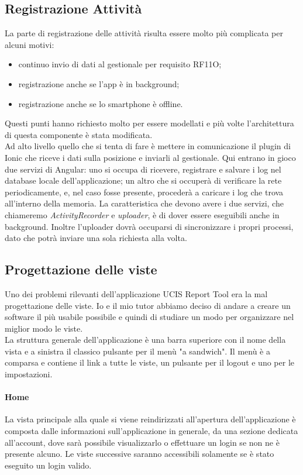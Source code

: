 \subsection{Registrazione Attività}
La parte di registrazione delle attività risulta essere molto più complicata per alcuni motivi:
\begin{itemize}
  \item continuo invio di dati al gestionale per requisito RF11O;
  \item registrazione anche se l'app è in background;
  \item registrazione anche se lo smartphone è offline.
\end{itemize}
Questi punti hanno richiesto molto per essere modellati e più volte l'architettura di questa componente è stata modificata. \\
\noindent Ad alto livello quello che si tenta di fare è mettere in comunicazione il plugin di Ionic che riceve i dati sulla posizione e inviarli al
gestionale. Qui entrano in gioco due servizi di Angular: uno si occupa di ricevere, registrare e salvare i log nel database locale
dell'applicazione; un altro che si occuperà di verificare la rete periodicamente, e, nel caso fosse presente, procederà a caricare i log che
trova all'interno della memoria. La caratteristica che devono avere i due servizi, che chiameremo \textit{ActivityRecorder} e \textit{uploader}, è di dover
essere eseguibili anche in background. Inoltre l'uploader dovrà occuparsi di sincronizzare i propri processi, dato che potrà inviare una
sola richiesta alla volta. 

\subsection{Progettazione delle viste}
Uno dei problemi rilevanti dell'applicazione UCIS Report Tool era la mal progettazione delle viste. Io e il mio tutor
abbiamo deciso di andare a creare un software il più usabile possibile e quindi di studiare un modo per organizzare nel
miglior modo le viste. \\ 
\noindent La struttura generale dell'applicazione è una barra superiore con il nome della vista e a sinistra il classico
pulsante per il menù "a sandwich". Il menù è a comparsa e contiene il link a tutte le viste, un pulsante per il logout e
uno per le impostazioni. 

\paragraph{Home}
La vista principale alla quale si viene reindirizzati all'apertura dell'applicazione è composta dalle informazioni
sull'applicazione in generale, da una sezione dedicata all'account, dove sarà possibile visualizzarlo o effettuare un
login se non ne è presente alcuno. Le viste successive saranno accessibili solamente se è stato eseguito un login
valido.

